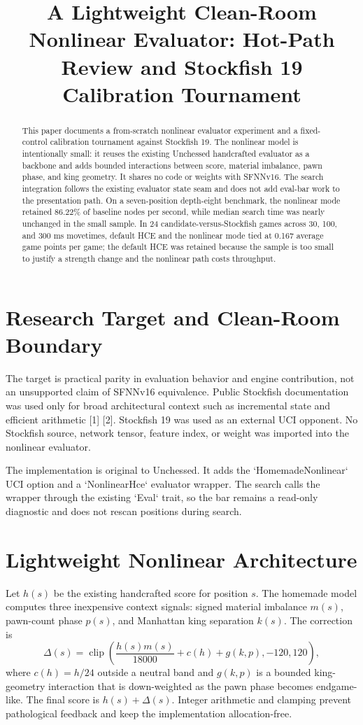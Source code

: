 \documentclass[10pt,conference]{IEEEtran}
\title{A Lightweight Clean-Room Nonlinear Evaluator: Hot-Path Review and Stockfish 19 Calibration Tournament}
\author{\IEEEauthorblockN{Manus AI}\IEEEauthorblockA{Unchessed UCI Engine Research\\September 2026}}
\begin{document}
\maketitle
\begin{abstract}
This paper documents a from-scratch nonlinear evaluator experiment and a fixed-control calibration tournament against Stockfish 19. The nonlinear model is intentionally small: it reuses the existing Unchessed handcrafted evaluator as a backbone and adds bounded interactions between score, material imbalance, pawn phase, and king geometry. It shares no code or weights with SFNNv16. The search integration follows the existing evaluator state seam and does not add eval-bar work to the presentation path. On a seven-position depth-eight benchmark, the nonlinear mode retained 86.22\% of baseline nodes per second, while median search time was nearly unchanged in the small sample. In 24 candidate-versus-Stockfish games across 30, 100, and 300 ms movetimes, default HCE and the nonlinear mode tied at 0.167 average game points per game; the default HCE was retained because the sample is too small to justify a strength change and the nonlinear path costs throughput.
\end{abstract}

\section{Research Target and Clean-Room Boundary}
The target is practical parity in evaluation behavior and engine contribution, not an unsupported claim of SFNNv16 equivalence. Public Stockfish documentation was used only for broad architectural context such as incremental state and efficient arithmetic [1] [2]. Stockfish 19 was used as an external UCI opponent. No Stockfish source, network tensor, feature index, or weight was imported into the nonlinear evaluator.

The implementation is original to Unchessed. It adds the `HomemadeNonlinear` UCI option and a `NonlinearHce` evaluator wrapper. The search calls the wrapper through the existing `Eval` trait, so the bar remains a read-only diagnostic and does not rescan positions during search.

\section{Lightweight Nonlinear Architecture}
Let $h(s)$ be the existing handcrafted score for position $s$. The homemade model computes three inexpensive context signals: signed material imbalance $m(s)$, pawn-count phase $p(s)$, and Manhattan king separation $k(s)$. The correction is
\begin{equation}
\Delta(s)=\operatorname{clip}\left(\frac{h(s)m(s)}{18000}+c(h)+g(k,p),-120,120\right),
\end{equation}
where $c(h)=h/24$ outside a neutral band and $g(k,p)$ is a bounded king-geometry interaction that is down-weighted as the pawn phase becomes endgame-like. The final score is $h(s)+\Delta(s)$. Integer arithmetic and clamping prevent pathological feedback and keep the implementation allocation-free.
\end{document}
